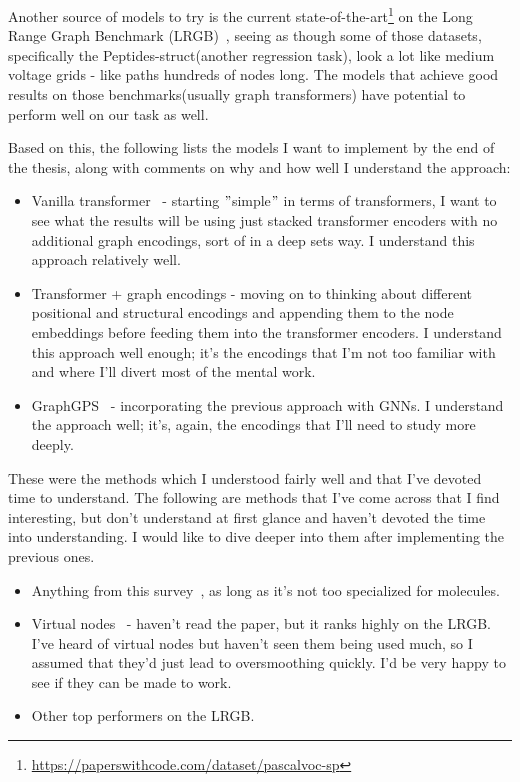 Another source of models to try is the current
state-of-the-art\footnote{\url{https://paperswithcode.com/dataset/pascalvoc-sp}} on the
Long Range Graph Benchmark (LRGB)~\cite{dwivedi2022long}, seeing as though some of those
datasets, specifically the Peptides-struct(another regression task), look a lot like
medium voltage grids - like paths hundreds of nodes long.
The models that achieve good results on those benchmarks(usually graph transformers)
have potential to perform well on our task as well.

Based on this, the following lists the models I want to implement by the end of the thesis,
along with comments on why and how well I understand the approach:
\begin{itemize}
    \item Vanilla transformer~\cite{vaswani2017attention} - starting \("\)simple\("\) in terms of transformers, I want to
    see what the results will be using just stacked transformer encoders with no additional graph
    encodings, sort of in a deep sets way.
    I understand this approach relatively well.
    \item Transformer + graph encodings - moving on to thinking about different positional and structural encodings
    and appending them to the node embeddings before feeding them into the transformer encoders.
    I understand this approach well enough; it's the encodings that I'm not too familiar with and where I'll
    divert most of the mental work.
    \item GraphGPS~\cite{rampavsek2022recipe} - incorporating the previous approach with GNNs.
    I understand the approach well; it's, again, the encodings that I'll need to study more deeply.
\end{itemize}

These were the methods which I understood fairly well and that I've devoted time to understand.
The following are methods that I've come across that I find interesting, but don't understand at first glance
and haven't devoted the time into understanding.
I would like to dive deeper into them after implementing the previous ones.
\begin{itemize}
    \item Anything from this survey~\cite{muller2023attending}, as long as it's not too specialized for molecules.
    \item Virtual nodes~\cite{cai2023connection} - haven't read the paper, but it ranks highly on the LRGB.
    I've heard of virtual nodes but haven't seen them being used much, so I assumed that they'd just lead to oversmoothing
    quickly.
    I'd be very happy to see if they can be made to work.
    \item Other top performers on the LRGB.
\end{itemize}
